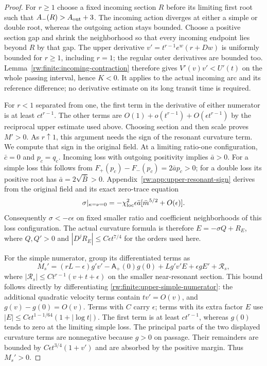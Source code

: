 \begin{proof}
For $r\ge1$ choose a fixed incoming section $R$ before its limiting
first root such that $A_-(R)>A_{\rm out}+3$. The incoming action
diverges at either a simple or double root, whereas the outgoing
action stays bounded. Choose a positive section gap and shrink the
neighborhood so that every incoming endpoint lies beyond $R$ by
that gap. The upper derivative
$v'=t^{r-1}e^w(r+Dw)$ is uniformly bounded for $r\ge1$, including
$r=1$; the regular outer derivatives are bounded too.
Lemma~\ref{rw:finite:incoming-contraction} therefore gives
$V'(v)v'<U'(t)$ on the whole passing interval, hence $K<0$.
It applies to the actual incoming arc and its reference difference;
no derivative estimate on its long transit time is required.

For $r<1$ separated from one, the first term in the derivative of
either numerator is at least $ct^{r-1}$. The other terms are
$O(1)+o(t^{r-1})+O(\epsilon t^{r-1})$ by the reciprocal upper
estimate used above. Choosing section and then scale proves $M'>0$.
As $r\uparrow1$, this argument needs the sign of the resonant
curvature term. We compute that sign in the original field.
At a limiting ratio-one configuration, $\bar c=0$ and $p_c=q_c$.
Incoming loss with outgoing positivity implies $\bar a>0$.
For a simple loss this follows from
$F_+(p_c)-F_-(p_c)=2\bar ap_c>0$; for a double loss its positive
root has $\bar a=2\sqrt{\bar B}>0$.
Appendix~\ref{rw:app:upper-resonant-sign} derives from the original
field and its exact zero-trace equation
\[
 \sigma|_{\kappa=\nu=0}
  =-\chi_{\rm loc}^2\epsilon\bar a
                       [\bar m^{5/2}+O(\epsilon)].
\]
Consequently $\sigma<-c\epsilon$ on fixed smaller ratio and
coefficient neighborhoods of this loss configuration.
The actual curvature formula is therefore
$E=-\sigma Q+R_E$, where $Q,Q'>0$ and
$|D^jR_E|\le C\epsilon t^{7/4}$ for the orders used here.

For the simple numerator, group its differentiated terms as
\[
 M_s'=(rL-\epsilon)g'v'-\mathsf A_+(0)g(0)
       +Lg'v'E+\epsilon gE'+\mathcal R_s,
\]
where
$|\mathcal R_s|\le Ct^{r-1}(v+t+\epsilon)$ on the smaller
near-resonant section. This bound follows directly by differentiating
\eqref{rw:finite:upper-simple-numerator}: the additional quadratic
velocity terms contain $tv'=O(v)$, and $g(v)-g(0)=O(v)$.
Terms with $C$ carry $\epsilon$; terms with its extra factor $E$
use $|E|\le C\epsilon t^{1-1/64}(1+|\log t|)$.
The first term is at least $ct^{r-1}$, whereas $g(0)$ tends to zero
at the limiting simple loss. The principal parts of the two displayed
curvature terms are nonnegative because $g>0$ on passage. Their
remainders are bounded by $C\epsilon t^{3/4}(1+v')$ and are
absorbed by the positive margin. Thus $M_s'>0$.


\end{proof}
